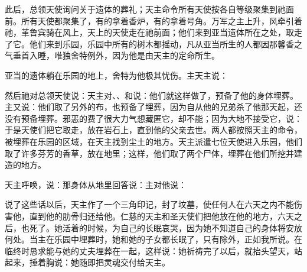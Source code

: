 此后，总领天使询问关于遗体的葬礼；天主命令所有天使按各自等级聚集到祂面前。所有天使都聚集了，有的拿着香炉，有的拿着号角。万军之主上升，风牵引着祂，革鲁宾骑在风上，天上的天使走在祂前面；他们来到亚当遗体所在之处，取走了它。他们来到乐园，乐园中所有的树木都摇动，凡从亚当所生的人都因那馨香之气垂首入睡，唯独舍特例外，因为他是由天主的定命所生。\par

亚当的遗体躺在乐园的地上，舍特为他极其忧伤。主天主说：\par

然后祂对总领天使说：天主对、、和说：他们就这样做了，预备了他的身体埋葬。主又说：他们取了另外的布，也预备了埋葬，因为自从他的兄弟杀了他那天起，还没有预备埋葬。邪恶的费了很大力气想藏匿它，却不能；因为大地不接受它，说：于是天使们把它取走，放在岩石上，直到他的父亲去世。两人都按照天主的命令，被埋葬在乐园的区域，在天主找到尘土的地方。天主派遣七位天使进入乐园，他们取了许多芬芳的香草，放在地里；这样，他们取了两个尸体，埋葬在他们所挖并建造的地方。\par

天主呼唤，说：那身体从地里回答说：主对他说：\par

说了这些话以后，天主作了一个三角印记，封了坟墓，使任何人在六天之内不能伤害他，直到他的肋骨归还给他。仁慈的天主和圣天使们把他放在他的地方，六天之后，也死了。她活着的时候，为自己的长眠哀哭，因为她不知道自己的身体将安放何处。当主在乐园中埋葬时，她和她的子女都长眠了，只有除外，正如我所说。在临终时恳求能与她的丈夫埋葬在一起，这样说：她祈祷完了以后，就抬头望天，站起来，捶着胸说：她随即把灵魂交付给天主。\par

